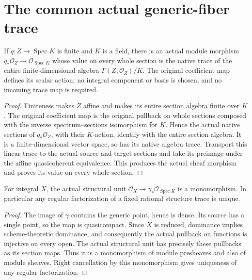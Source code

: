 \section{The common actual generic-fiber trace}

\begin{lemma}
\label{lem:kn-structure-trace-field-producer}
\leanok
If $q:Z\to\operatorname{Spec}K$ is finite and $K$ is a field, there is
an actual module morphism $q_*\mathcal O_Z\to\mathcal O_{\operatorname{Spec}K}$
whose value on every whole section is the native trace of the entire
finite-dimensional algebra $\Gamma(Z,\mathcal O_Z)/K$. The original
coefficient map defines its scalar action; no integral component or
basis is chosen, and no incoming trace map is required.
\end{lemma}
\begin{proof}
Finiteness makes $Z$ affine and makes its entire section algebra finite
over $K$. The original coefficient map is the original pullback on
whole sections composed with the inverse spectrum--sections
isomorphism for $K$. Hence the actual native sections of $q_*\mathcal
O_Z$, with their $K$-action, identify with the entire section algebra.
It is a finite-dimensional vector space, so has its native algebra
trace. Transport this linear trace to the actual source and target
sections and take its preimage under the affine quasicoherent
equivalence. This produces the actual sheaf morphism and proves its
value on every whole section.
\end{proof}

\begin{lemma}
\label{lem:kn-structure-trace-generic-unit-mono}
\leanok
For integral $X$, the actual structural unit
$\mathcal O_X\to\gamma_*\mathcal O_{\operatorname{Spec}K}$ is a
monomorphism. In particular any regular factorization of a fixed
rational structure trace is unique.
\end{lemma}
\begin{proof}
The image of $\gamma$ contains the generic point, hence is dense. Its
source has a single point, so the map is quasicompact. Since $X$ is
reduced, dominance implies scheme-theoretic dominance, and consequently
the actual pullback on functions is injective on every open. The actual
structural unit has precisely these pullbacks as its section maps.
Thus it is a monomorphism of module presheaves and also of module
sheaves. Right cancellation by this monomorphism gives uniqueness of
any regular factorization.
\end{proof}

